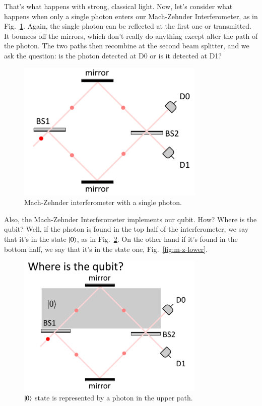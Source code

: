 That's what happens with strong, classical light. Now, let's consider what happens when only a single photon enters our Mach-Zehnder Interferometer, as in Fig.~\ref{fig:mach-zehnder-single-photon}. Again, the single photon can be reflected at the first one or transmitted. It bounces off the mirrors, which don't really do anything except alter the path of the photon.  The two paths then recombine at the second beam splitter, and we ask the question: is the photon detected at D0 or is it detected at D1?
\begin{figure}[H]
   \centering
    \includegraphics[width=0.8\textwidth]{lesson6/mach_zehnder_single_photon.pdf}
    
        \caption{Mach-Zehnder interferometer with a single photon.}
    \label{fig:mach-zehnder-single-photon}    
\end{figure}

Also, the Mach-Zehnder Interferometer implements our qubit. How? Where is the qubit? Well, if the photon is found in the top half of the interferometer, we say that it's in the state $\left| 0 \right\rangle$, as in Fig.~\ref{fig:m-z-upper}. On the other hand if it's found in the bottom half, we say that it's in the state one, Fig.~\ref{fig:m-z-lower}. 

\begin{figure}[H]
   \centering
    \includegraphics[width=0.8\textwidth]{lesson6/0_ket_botttom.pdf}
    
        \caption{$\left| 0 \right\rangle$ state is represented by a photon in the upper path.}
    \label{fig:m-z-upper}
    
\end{figure}

